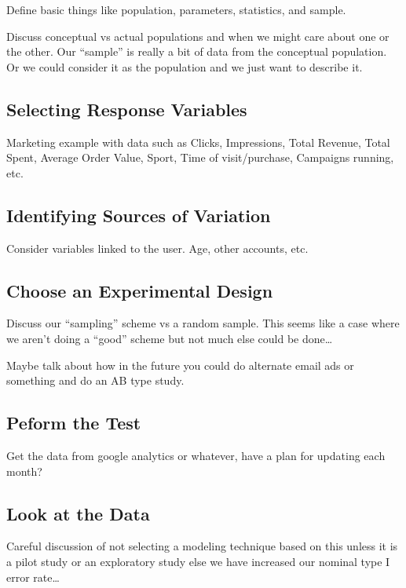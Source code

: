 \documentclass[]{book}
\begin{document}
Define basic things like population, parameters, statistics, and sample.

Discuss conceptual vs actual populations and when we might care about
one or the other. Our ``sample'' is really a bit of data from the
conceptual population. Or we could consider it as the population and we
just want to describe it.

\subsection{Selecting Response
Variables}\label{selecting-response-variables}

Marketing example with data such as Clicks, Impressions, Total Revenue,
Total Spent, Average Order Value, Sport, Time of visit/purchase,
Campaigns running, etc.

\subsection{Identifying Sources of
Variation}\label{identifying-sources-of-variation}

Consider variables linked to the user. Age, other accounts, etc.

\subsection{Choose an Experimental Design
}\label{choose-an-experimental-design}

Discuss our ``sampling'' scheme vs a random sample. This seems like a
case where we aren't doing a ``good'' scheme but not much else could be
done\ldots{}

Maybe talk about how in the future you could do alternate email ads or
something and do an AB type study.

\subsection{Peform the Test }\label{peform-the-test}

Get the data from google analytics or whatever, have a plan for updating
each month?

\subsection{Look at the Data }\label{look-at-the-data}

Careful discussion of not selecting a modeling technique based on this
unless it is a pilot study or an exploratory study else we have
increased our nominal type I error rate\ldots{}
\end{document}
